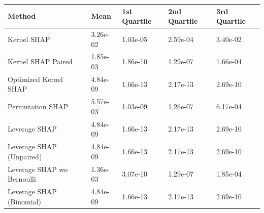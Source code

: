\begin{tabular}{lllll}
  \toprule
  \textbf{Method} & \textbf{Mean} & \textbf{1st Quartile} & \textbf{2nd Quartile} & \textbf{3rd Quartile} \\ \midrule
Kernel SHAP & 3.26e-02 & 1.03e-05 & 2.59e-04 & 3.40e-02\\
Kernel SHAP Paired & 1.85e-03 & 1.86e-10 & 1.29e-07 & 1.66e-04\\
Optimized Kernel SHAP & \cellcolor{gold!60}4.84e-09 & \cellcolor{gold!60}1.66e-13 & \cellcolor{gold!60}2.17e-13 & \cellcolor{gold!60}2.69e-10\\
Permutation SHAP & 5.57e-03 & 1.03e-09 & 1.26e-07 & 6.17e-04\\
Leverage SHAP & \cellcolor{gold!60}4.84e-09 & \cellcolor{gold!60}1.66e-13 & \cellcolor{gold!60}2.17e-13 & \cellcolor{gold!60}2.69e-10\\
Leverage SHAP (Unpaired) & \cellcolor{gold!60}4.84e-09 & \cellcolor{gold!60}1.66e-13 & \cellcolor{gold!60}2.17e-13 & \cellcolor{gold!60}2.69e-10\\
Leverage SHAP wo Bernoulli & 1.36e-03 & 3.07e-10 & 1.29e-07 & 1.85e-04\\
Leverage SHAP (Binomial) & \cellcolor{gold!60}4.84e-09 & \cellcolor{gold!60}1.66e-13 & \cellcolor{gold!60}2.17e-13 & \cellcolor{gold!60}2.69e-10\\
\bottomrule
\end{tabular}
